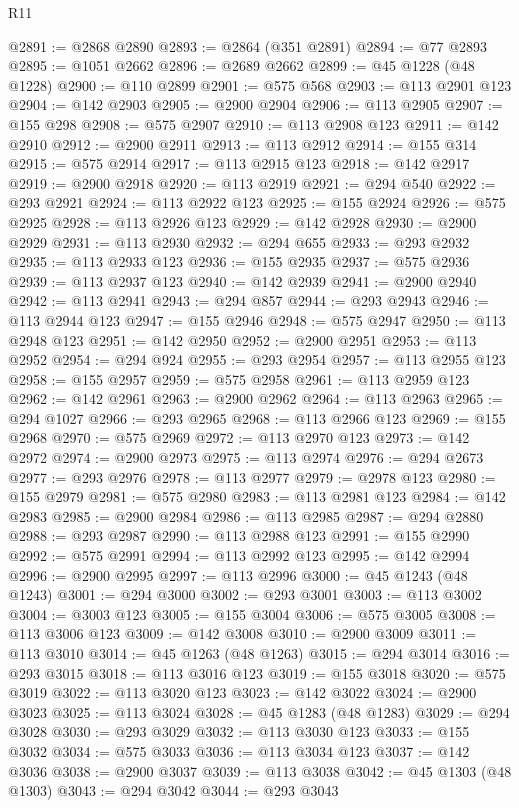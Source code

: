 \begin{lexlean}{R11}
\begin{coremodule}
{{{{{{{{{{{{{{{{{{{{{{{{{{{{{{{{{{{{{{{{{{{{{{{{{{{{{{{{{{{{{{{{{{{{{{{{{{{{{{{{{{{{{{{{{{{{{{{{{{{{{{{{{{@2891 := @2868 @2890
@2893 := @2864 (@351 @2891)
@2894 := @77 @2893
@2895 := @1051 @2662
@2896 := @2689 @2662
@2899 := @45 @1228 (@48 @1228)
@2900 := @110 @2899
@2901 := @575 @568
@2903 := @113 @2901 @123
@2904 := @142 @2903
@2905 := @2900 @2904
@2906 := @113 @2905
@2907 := @155 @298
@2908 := @575 @2907
@2910 := @113 @2908 @123
@2911 := @142 @2910
@2912 := @2900 @2911
@2913 := @113 @2912
@2914 := @155 @314
@2915 := @575 @2914
@2917 := @113 @2915 @123
@2918 := @142 @2917
@2919 := @2900 @2918
@2920 := @113 @2919
@2921 := @294 @540
@2922 := @293 @2921
@2924 := @113 @2922 @123
@2925 := @155 @2924
@2926 := @575 @2925
@2928 := @113 @2926 @123
@2929 := @142 @2928
@2930 := @2900 @2929
@2931 := @113 @2930
@2932 := @294 @655
@2933 := @293 @2932
@2935 := @113 @2933 @123
@2936 := @155 @2935
@2937 := @575 @2936
@2939 := @113 @2937 @123
@2940 := @142 @2939
@2941 := @2900 @2940
@2942 := @113 @2941
@2943 := @294 @857
@2944 := @293 @2943
@2946 := @113 @2944 @123
@2947 := @155 @2946
@2948 := @575 @2947
@2950 := @113 @2948 @123
@2951 := @142 @2950
@2952 := @2900 @2951
@2953 := @113 @2952
@2954 := @294 @924
@2955 := @293 @2954
@2957 := @113 @2955 @123
@2958 := @155 @2957
@2959 := @575 @2958
@2961 := @113 @2959 @123
@2962 := @142 @2961
@2963 := @2900 @2962
@2964 := @113 @2963
@2965 := @294 @1027
@2966 := @293 @2965
@2968 := @113 @2966 @123
@2969 := @155 @2968
@2970 := @575 @2969
@2972 := @113 @2970 @123
@2973 := @142 @2972
@2974 := @2900 @2973
@2975 := @113 @2974
@2976 := @294 @2673
@2977 := @293 @2976
@2978 := @113 @2977
@2979 := @2978 @123
@2980 := @155 @2979
@2981 := @575 @2980
@2983 := @113 @2981 @123
@2984 := @142 @2983
@2985 := @2900 @2984
@2986 := @113 @2985
@2987 := @294 @2880
@2988 := @293 @2987
@2990 := @113 @2988 @123
@2991 := @155 @2990
@2992 := @575 @2991
@2994 := @113 @2992 @123
@2995 := @142 @2994
@2996 := @2900 @2995
@2997 := @113 @2996
@3000 := @45 @1243 (@48 @1243)
@3001 := @294 @3000
@3002 := @293 @3001
@3003 := @113 @3002
@3004 := @3003 @123
@3005 := @155 @3004
@3006 := @575 @3005
@3008 := @113 @3006 @123
@3009 := @142 @3008
@3010 := @2900 @3009
@3011 := @113 @3010
@3014 := @45 @1263 (@48 @1263)
@3015 := @294 @3014
@3016 := @293 @3015
@3018 := @113 @3016 @123
@3019 := @155 @3018
@3020 := @575 @3019
@3022 := @113 @3020 @123
@3023 := @142 @3022
@3024 := @2900 @3023
@3025 := @113 @3024
@3028 := @45 @1283 (@48 @1283)
@3029 := @294 @3028
@3030 := @293 @3029
@3032 := @113 @3030 @123
@3033 := @155 @3032
@3034 := @575 @3033
@3036 := @113 @3034 @123
@3037 := @142 @3036
@3038 := @2900 @3037
@3039 := @113 @3038
@3042 := @45 @1303 (@48 @1303)
@3043 := @294 @3042
@3044 := @293 @3043
}}}}}}}}}}}}}}}}}}}}}}}}}}}}}}}}}}}}}}}}}}}}}}}}}}}}}}}}}}}}}}}}}}}}}}}}}}}}}}}}}}}}}}}}}}}}}}}}}}}}}}}}}}
\end{coremodule}
\end{lexlean}
